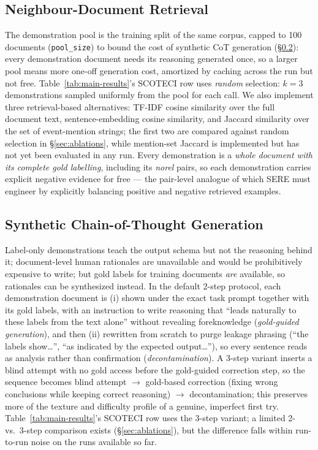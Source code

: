 \documentclass[11pt]{article}
\newcommand{\method}{SCOTECI}
\begin{document}
\subsection{Neighbour-Document Retrieval}
\label{sec:retrieval}
The demonstration pool is the training split of the same corpus, capped to 100
documents (\texttt{pool\_size}) to bound the cost of synthetic CoT generation
(\S\ref{sec:synthcot}): every demonstration document needs its reasoning generated
once, so a larger pool means more one-off generation cost, amortized by caching
across the run but not free. Table~\ref{tab:main-results}'s \method{} row uses
\emph{random} selection: $k=3$ demonstrations sampled uniformly from the pool for
each call. We also implement three retrieval-based alternatives: TF-IDF cosine
similarity over the full document text, sentence-embedding cosine similarity, and
Jaccard similarity over the set of event-mention strings; the first two are
compared against random selection in \S\ref{sec:ablations}, while mention-set
Jaccard is implemented but has not yet been evaluated in any run. Every
demonstration is a \emph{whole document with its complete gold labelling},
including its \textit{norel} pairs, so each demonstration carries explicit negative
evidence for free --- the pair-level analogue of which SERE must engineer by
explicitly balancing positive and negative retrieved examples.

\subsection{Synthetic Chain-of-Thought Generation}
\label{sec:synthcot}
Label-only demonstrations teach the output schema but not the reasoning behind it;
document-level human rationales are unavailable and would be prohibitively
expensive to write; but gold labels for training documents \emph{are} available, so
rationales can be synthesized instead. In the default 2-step protocol, each
demonstration document is (i) shown under the exact task prompt together with its
gold labels, with an instruction to write reasoning that ``leads naturally to these
labels from the text alone'' without revealing foreknowledge (\emph{gold-guided
generation}), and then (ii) rewritten from scratch to purge leakage phrasing
(``the labels show\dots'', ``as indicated by the expected output\dots''), so every
sentence reads as analysis rather than confirmation (\emph{decontamination}). A
3-step variant inserts a blind attempt with no gold access before the gold-guided
correction step, so the sequence becomes blind attempt $\to$ gold-based correction
(fixing wrong conclusions while keeping correct reasoning) $\to$ decontamination;
this preserves more of the texture and difficulty profile of a genuine, imperfect
first try. Table~\ref{tab:main-results}'s \method{} row uses the 3-step variant; a
limited 2- vs.\ 3-step comparison exists (\S\ref{sec:ablations}), but the
difference falls within run-to-run noise on the runs available so far.
\end{document}
